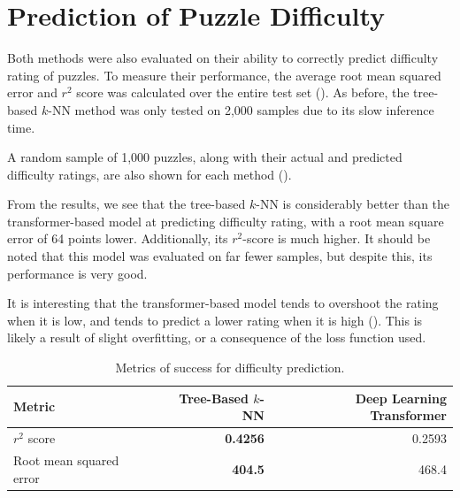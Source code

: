 \section{Prediction of Puzzle Difficulty}\label{evalS2}

Both methods were also evaluated on their ability to correctly predict
difficulty rating of puzzles. To measure their performance, the average root
mean squared error and $r^2$ score was calculated over the entire test set
(). As before, the tree-based $k$-NN method was only tested on
2,000 samples due to its slow inference time. 

A random sample of 1,000 puzzles, along with their actual and predicted
difficulty ratings, are also shown for each method
().

From the results, we see that the tree-based $k$-NN is considerably better than
the transformer-based model at predicting difficulty rating, with a root mean
square error of 64 points lower. Additionally, its $r^2$-score is much higher.
It should be noted that this model was evaluated on far fewer samples, but
despite this, its performance is very good.

It is interesting that the transformer-based model tends to overshoot the
rating when it is low, and tends to predict a lower rating when it is high
(). This is likely a result of slight overfitting, or a
consequence of the loss function used.

\begin{table}[H]
  \centering
  \begin{tabular}{l|rr}
    Metric & Tree-Based $k$-NN & Deep Learning Transformer \\
    \hline
    $r^2$ score & \textbf{0.4256} & 0.2593 \\
    Root mean squared error & \textbf{404.5} & 468.4 \\
  \end{tabular}
  \caption{Metrics of success for difficulty prediction.}
  \label{diffTable}
\end{table}

